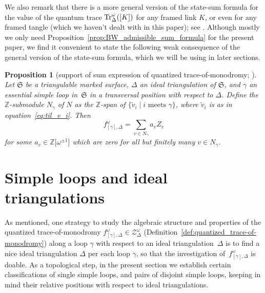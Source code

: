 \documentclass[10pt,a4paper]{amsart}
\numberwithin{equation}{section}
\newtheorem{Proposition}[Theorem]{Proposition}
\theoremstyle{definition}
\newcommand{\til}[1]{\widetilde{#1}}
\begin{document}
We also remark that there is a more general version of the state-sum formula for the value of the quantum trace ${\rm Tr}^\omega_\Delta([K])$ for any framed link $K$, or even for any framed tangle (which we haven't dealt with in this paper); see \cite{BW}. Although mostly we only need Proposition~\ref{prop:BW_admissible_sum_formula} for the present paper, we find it convenient to state the following weak consequence of the general version of the state-sum formula, which we will be using in later sections.
\begin{Proposition}[support of sum expression of quantized trace-of-monodromy; \cite{BW}]
\label{prop:weak_sum}
Let $\mathfrak{S}$ be a triangulable marked surface, $\Delta$ an ideal triangulation of $\mathfrak{S}$, and $\gamma$ an essential simple loop in~$\mathfrak{S}$ in a transversal position with respect to $\Delta$. Define the $\mathbb{Z}$-submodule $N_\gamma$ of $N$ as the $\mathbb{Z}$-span of $\{\til{v}_i \mid \mbox{$i$ meets $\gamma$}\}$, where $\til{v}_i$ is as in equation~\eqref{eq:til_v_i}. Then
\[
f^\omega_{[\gamma],\Delta} = \sum_{v\in N_\gamma} a_v Z_v
\]
for some $a_v \in \mathbb{Z}\bigl[\omega^{\pm 1}\bigr]$ which are zero for all but finitely many $v\in N_\gamma$.
\end{Proposition}
\section{Simple loops and ideal triangulations}
As mentioned, one strategy to study the algebraic structure and properties of the quantized trace-of-monodromy $f^\omega_{[\gamma],\Delta} \in \mathcal{Z}^\omega_\Delta$ (Definition~\ref{def:quantized_trace-of-monodromy}) along a loop $\gamma$ with respect to an ideal triangulation~$\Delta$ is to find a nice ideal triangulation $\Delta$ per each loop $\gamma$, so that the investigation of~$f^\omega_{[\gamma],\Delta}$ is doable. As a topological step, in the present section we establish certain classifications of single simple loops, and pairs of disjoint simple loops, keeping in mind their relative positions with respect to ideal triangulations.
\end{document}
